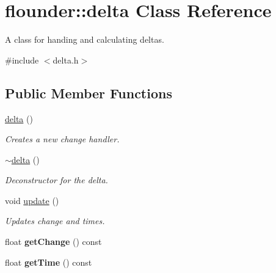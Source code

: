 \hypertarget{classflounder_1_1delta}{}\section{flounder\+:\+:delta Class Reference}
\label{classflounder_1_1delta}


A class for handing and calculating deltas.  




{\ttfamily \#include $<$delta.\+h$>$}

\subsection*{Public Member Functions}
\begin{DoxyCompactItemize}
\item 
\hyperlink{classflounder_1_1delta_a6996799d2f9423e994e2beb84dc3ba09}{delta} ()
\begin{DoxyCompactList}\small\item\em Creates a new change handler. \end{DoxyCompactList}\item 
\hyperlink{classflounder_1_1delta_af9eb174b15b3730a45a903e988dac1e8}{$\sim$delta} ()
\begin{DoxyCompactList}\small\item\em Deconstructor for the delta. \end{DoxyCompactList}\item 
void \hyperlink{classflounder_1_1delta_a6f87fd0b76d229ec490a07a565c2afd0}{update} ()
\begin{DoxyCompactList}\small\item\em Updates change and times. \end{DoxyCompactList}\item 
\mbox{\label{classflounder_1_1delta_ac1807f994e592b1f04447dbddcdacb9f}} 
float {\bfseries get\+Change} () const
\item 
\mbox{\label{classflounder_1_1delta_a9db78508227a6e75540985cb1d538ec1}} 
float {\bfseries get\+Time} () const
\end{DoxyCompactItemize}
